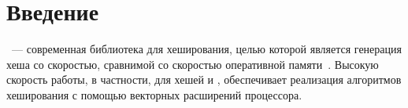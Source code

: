
\section*{Введение}
\thispagestyle{withCompileDate}

\xxHash{}~--- современная библиотека для хеширования, целью которой является генерация хеша со скоростью, сравнимой со скоростью оперативной памяти~\cite{githubGitHubCyan4973xxHash}.
Высокую скорость работы, в частности, для хешей  и , обеспечивает реализация алгоритмов хеширования с помощью векторных расширений процессора.
